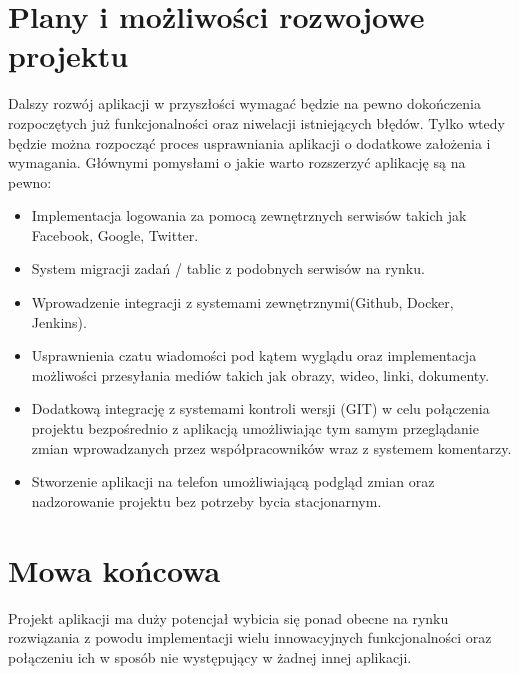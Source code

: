 \documentclass[eng,printmode]{mgr}
\begin{document}
\section{Plany i możliwości rozwojowe projektu}
Dalszy rozwój aplikacji w przyszłości wymagać będzie na pewno dokończenia rozpoczętych już funkcjonalności oraz niwelacji istniejących błędów. Tylko wtedy będzie można rozpocząć proces usprawniania aplikacji o dodatkowe założenia i wymagania. Głównymi pomysłami o jakie warto rozszerzyć aplikację są na pewno:
\begin{itemize}
  \item Implementacja logowania za pomocą zewnętrznych serwisów takich jak Facebook, Google, Twitter.
  \item System migracji zadań / tablic z podobnych serwisów na rynku.
  \item Wprowadzenie integracji z systemami zewnętrznymi(Github, Docker, Jenkins).
  \item Usprawnienia czatu wiadomości pod kątem wyglądu oraz implementacja możliwości przesyłania mediów takich jak obrazy, wideo, linki, dokumenty.
  \item Dodatkową integrację z systemami kontroli wersji (GIT) w celu połączenia projektu bezpośrednio z aplikacją umożliwiając tym samym przeglądanie zmian wprowadzanych przez współpracowników wraz z systemem komentarzy.
  \item Stworzenie aplikacji na telefon umożliwiającą podgląd zmian oraz nadzorowanie projektu bez potrzeby bycia stacjonarnym.
\end{itemize}
\section{Mowa końcowa}
Projekt aplikacji ma duży potencjał wybicia się ponad obecne na rynku rozwiązania z powodu implementacji wielu innowacyjnych funkcjonalności oraz połączeniu ich w sposób nie występujący w żadnej innej aplikacji.

\begingroup
\raggedright

\endgroup
\end{document}
